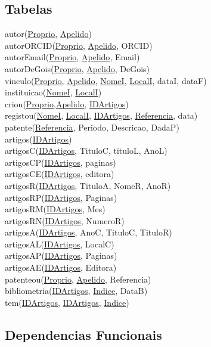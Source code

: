 \documentclass[a4paper]{article}
\begin{document}
\subsection{Tabelas}
autor(\underline{Proprio}, \underline{Apelido})\\
autorORCID(\underline{Proprio}, \underline{Apelido}, ORCID)\\
autorEmail(\underline{Proprio}, \underline{Apelido}, Email)\\
autorDeGois(\underline{Proprio}, \underline{Apelido}, DeGois)\\
vinculo(\underline{Proprio}, \underline{Apelido}, \underline{NomeI}, \underline{LocalI}, dataI, dataF)\\
instituicao(\underline{NomeI}, \underline{LocalI})\\
criou(\underline{Proprio},\underline{Apelido}, \underline{IDArtigos})\\
registou(\underline{NomeI}, \underline{LocalI}, \underline{IDArtigos}, \underline{Referencia}, data)\\
patente(\underline{Referencia}, Periodo, Descricao, DadaP)\\
artigos(\underline{IDArtigos})\\
artigosC(\underline{IDArtigos}, TituloC, tituloL, AnoL)\\
artigosCP(\underline{IDArtigos}, paginas)\\
artigosCE(\underline{IDArtigos}, editora)\\
artigosR(\underline{IDArtigos}, TituloA, NomeR, AnoR)\\
artigosRP(\underline{IDArtigos}, Paginas)\\
artigosRM(\underline{IDArtigos}, Mes)\\
artigosRN(\underline{IDArtigos}, NumeroR)\\
artigosA(\underline{IDArtigos}, AnoC, TituloC, TituloR)\\
artigosAL(\underline{IDArtigos}, LocalC)\\
artigosAP(\underline{IDArtigos}, Paginas)\\
artigosAE(\underline{IDArtigos}, Editora)\\
patenteou(\underline{Proprio}, \underline{Apelido}, Referencia)\\
bibliometria(\underline{IDArtigos}, \underline{Indice}, DataB)\\
tem(\underline{IDArtigos}, \underline{IDArtigos}, \underline{Indice})\\

\newpage
\subsection{Dependencias Funcionais}
\end{document}

